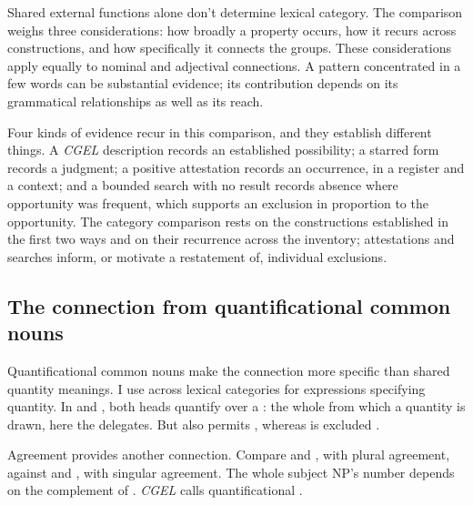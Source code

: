 \documentclass[12pt]{article}
\begin{document}
Shared external functions alone don't determine lexical category. The comparison weighs three considerations: how broadly a property occurs, how it recurs across constructions, and how specifically it connects the groups. These considerations apply equally to nominal and adjectival connections. A pattern concentrated in a few words can be substantial evidence; its contribution depends on its grammatical relationships as well as its reach.

Four kinds of evidence recur in this comparison, and they establish different things. A \textit{CGEL} description records an established possibility; a starred form records a judgment; a positive attestation records an occurrence, in a register and a context; and a bounded search with no result records absence where opportunity was frequent, which supports an exclusion in proportion to the opportunity. The category comparison rests on the constructions established in the first two ways and on their recurrence across the inventory; attestations and searches inform, or motivate a restatement of, individual exclusions.

\subsection{The connection from quantificational common nouns}\label{sec:quant-nouns}

Quantificational common nouns make the connection more specific than shared quantity meanings. I use  across lexical categories for expressions specifying quantity. In  and , both heads quantify over a : the whole from which a quantity is drawn, here the delegates. But  also permits , whereas  is excluded \citep[349]{huddleston2002}.

Agreement provides another connection. Compare  and , with plural agreement, against  and , with singular agreement. The whole subject NP's number depends on the complement of . \textit{CGEL} calls quantificational   \citep[349--350, 501--503]{huddleston2002}.
\end{document}

